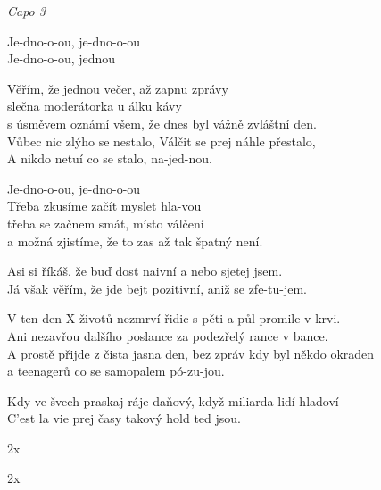 
\re{}
\textit{Capo 3 }

\cho{}
Je-dno-o-ou, je-dno-o-ou\\
Je-dno-o-ou, jednou 

\ve{}
Věřím, že jednou večer, až zapnu zprávy\\
slečna moderátorka u álku kávy\\
s úsměvem oznámí všem, že dnes byl vážně zvláštní den.\\
Vůbec nic zlýho se nestalo, Válčit se prej náhle přestalo,\\
A nikdo netuí co se stalo, na-jed-nou. 

Je-dno-o-ou, je-dno-o-ou\\
Třeba zkusíme začít myslet hla-vou\\
třeba se začnem smát, místo válčení\\
a možná zjistíme, že to zas až tak špatný není. 

\ve{}
Asi si říkáš, že buď dost naivní a nebo sjetej jsem.\\
Já však věřím, že jde bejt pozitivní, aniž se zfe-tu-jem. 

V ten den X životů nezmrví řidic s pěti a půl promile v krvi.\\
Ani nezavřou dalšího poslance za podezřelý rance v bance.\\
A prostě přijde z čista jasna den, bez zpráv kdy byl někdo okraden\\
a teenagerů co se samopalem pó-zu-jou.

Kdy ve švech praskaj ráje daňový, když miliarda lidí hladoví\\
C'est la vie prej časy takový hold teď jsou. 

\cho{}
2x

2x

\esong